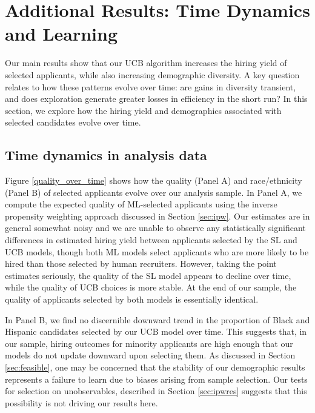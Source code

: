 \documentclass[crop,noquery,editorname,historyrev,nosurname,runningno,sepcount]{RESTUD}
\begin{document}
\section{Additional Results: Time Dynamics and Learning} \label{sec:learning}

Our main results show that our UCB algorithm increases the hiring yield of selected applicants, while also increasing demographic diversity.  A key question relates to how these patterns evolve over time: are gains in diversity transient, and does exploration generate greater losses in efficiency in the short run?  In this section, we explore how the hiring yield and demographics associated with selected candidates evolve over time.  

\subsection{Time dynamics in analysis data} \label{sec:dynamics}

Figure \ref{quality_over_time} shows how the quality (Panel A) and race/ethnicity (Panel B) of selected applicants evolve over our analysis sample.  In Panel A, we compute the expected quality of ML-selected applicants using the inverse propensity weighting approach discussed in Section \ref{sec:ipw}.  Our estimates are in general somewhat noisy and we are unable to observe any statistically significant differences in estimated hiring yield between applicants selected by the SL and UCB models, though both ML models select applicants who are more likely to be hired than those selected by human recruiters.  However, taking the point estimates seriously, the quality of the SL model appears to decline over time, while the quality of UCB choices is more stable.  At the end of our sample, the quality of applicants selected by both models is essentially identical.  

In Panel B, we find no discernible downward trend in the proportion of Black and Hispanic candidates selected by our UCB model over time. This suggests that, in our sample, hiring outcomes for minority applicants are high enough that our models do not update downward upon selecting them.  As discussed in Section \ref{sec:feasible}, one may be concerned that the stability of our demographic results represents a failure to learn due to biases arising from sample selection.  Our tests for selection on unobservables, described in Section \ref{sec:ipwres} suggests that this possibility is not driving our results here.  
\end{document}

